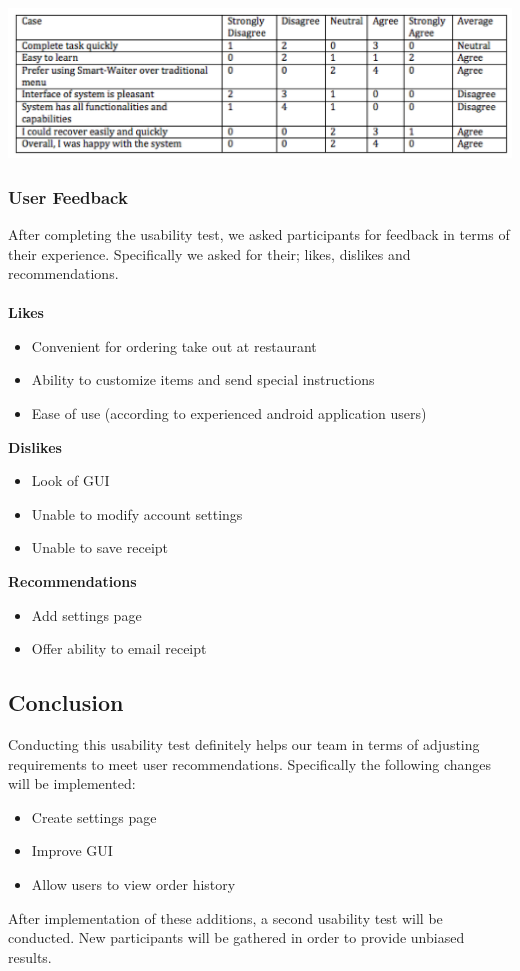 \documentclass[12pt, titlepage]{article}
\begin{document}
\includegraphics[width=1.2\textwidth]{usabilityResults.png}

\subsubsection{User Feedback}

After completing the usability test, we asked participants for feedback in terms of their experience. Specifically we asked for their; likes, dislikes and recommendations. 
\\\\
\textbf{Likes} 
\begin{itemize}
\item Convenient for ordering take out at restaurant  
\item Ability to customize items and send special instructions
\item Ease of use (according to experienced android application users)
\end{itemize}
\textbf{Dislikes}
\begin{itemize}
\item Look of GUI
\item Unable to modify account settings
\item Unable to save receipt 
\end{itemize}
\textbf{Recommendations}  
\begin{itemize}
\item Add settings page
\item Offer ability to email receipt
\end{itemize}
\subsection{Conclusion}
Conducting this usability test definitely helps our team in terms of adjusting requirements to meet user recommendations. Specifically the following changes will be implemented: 
\begin{itemize}
\item Create settings page
\item Improve GUI
\item Allow users to view order history
\end{itemize}
After implementation of these additions, a second usability test will be conducted. New participants will be gathered in order to provide unbiased results. 
\end{document}
